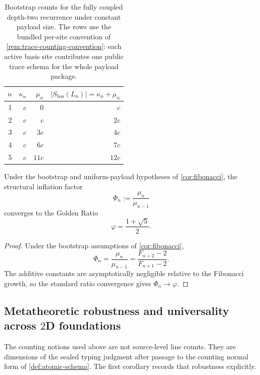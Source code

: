 \documentclass{lmcs}
\begin{document}
\begin{table}[t]
\centering
\begin{tabular}{rrrr}
\toprule
$n$ & $\kappa_n$ & $\mu_n$ & $|S_{\mathrm{bas}}(L_n)|=\kappa_n+\mu_n$ \\
\midrule
1 & $c$ & $0$ & $c$ \\
2 & $c$ & $c$ & $2c$ \\
3 & $c$ & $3c$ & $4c$ \\
4 & $c$ & $6c$ & $7c$ \\
5 & $c$ & $11c$ & $12c$ \\
\bottomrule
\end{tabular}
\caption{Bootstrap counts for the fully coupled depth-two recurrence under constant payload size. The rows use the bundled per-site convention of \autoref{rem:trace-counting-convention}: each active basis site contributes one public trace schema for the whole payload package.}
\label{tab:bootstrap-counts}
\end{table}

\begin{cor}
\label{cor:phi}
Under the bootstrap and uniform-payload hypotheses of \autoref{cor:fibonacci}, the structural inflation factor
\[
  \Phi_n := \frac{\mu_n}{\mu_{n-1}}
\]
converges to the Golden Ratio
\[
  \varphi = \frac{1+\sqrt{5}}{2}.
\]
\end{cor}

\begin{proof}
Under the bootstrap assumptions of \autoref{cor:fibonacci},
\[
  \Phi_n
  =
  \frac{\mu_n}{\mu_{n-1}}
  =
  \frac{F_{n+2}-2}{F_{n+1}-2}.
\]
The additive constants are asymptotically negligible relative to the Fibonacci growth, so the standard ratio convergence gives $\Phi_n \to \varphi$.
\end{proof}

\subsection{\texorpdfstring{Metatheoretic robustness and universality across $2$D foundations}{Metatheoretic robustness and universality across 2D foundations}}

The counting notions used above are not source-level line counts. They are dimensions of the sealed typing judgment after passage to the counting normal form of \autoref{def:atomic-schema}. The first corollary records that robustness explicitly.
\end{document}
